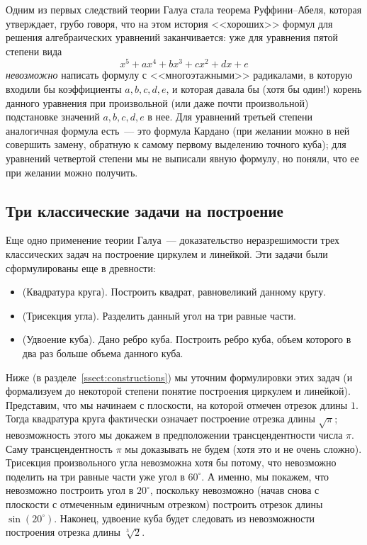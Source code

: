 \documentclass[a4paper,11pt]{scrartcl}
\theoremstyle{plain}
\theoremstyle{definition}
\begin{document}
Одним из первых следствий теории Галуа стала теорема Руффини--Абеля,
которая утверждает, грубо говоря, что на этом история <<хороших>>
формул для решения алгебраических уравнений заканчивается: уже для
уравнения пятой степени вида
$$
x^5 + ax^4 + bx^3 + cx^2 + dx + e
$$
{\em невозможно} написать формулу с <<многоэтажными>> радикалами,
в которую входили бы коэффициенты
$a,b,c,d,e$, и которая давала бы (хотя бы один!) корень данного
уравнения при произвольной (или даже почти произвольной) подстановке
значений $a,b,c,d,e$ в нее. Для уравнений третьей степени аналогичная
формула есть~--- это формула Кардано (при желании можно в ней
совершить замену, обратную к самому первому выделению точного куба);
для уравнений четвертой степени мы не выписали явную формулу, но
поняли, что ее при желании можно получить.

\subsection{Три классические задачи на построение}

Еще одно применение теории Галуа~--- доказательство неразрешимости
трех классических задач на построение циркулем и линейкой.
Эти задачи были сформулированы еще в древности:
\begin{itemize}
\item (Квадратура круга). Построить квадрат, равновеликий данному
кругу.
\item (Трисекция угла). Разделить данный угол на три равные части.
\item (Удвоение куба). Дано ребро куба. Построить ребро куба, объем
которого в два раз больше объема данного куба.
\end{itemize}

Ниже (в разделе~\ref{ssect:constructions}) мы уточним формулировки этих задач (и
формализуем до некоторой степени понятие построения циркулем и
линейкой). Представим, что мы начинаем с плоскости, на которой отмечен
отрезок длины $1$. Тогда квадратура круга фактически означает
построение отрезка длины $\sqrt{\pi}$; невозможность этого мы докажем
в предположении трансцендентности числа $\pi$. Саму трансцендентность
$\pi$ мы доказывать не будем (хотя это и не очень сложно).
Трисекция произвольного угла невозможна хотя бы потому, что невозможно
поделить на три равные части уже угол в $60^\circ$. А именно, мы
покажем, что невозможно построить угол в $20^\circ$, поскольку
невозможно (начав снова с плоскости с отмеченным единичным отрезком)
построить отрезок длины $\sin(20^\circ)$.
Наконец, удвоение куба будет следовать из невозможности построения
отрезка длины $\sqrt[3]{2}$.
\end{document}
